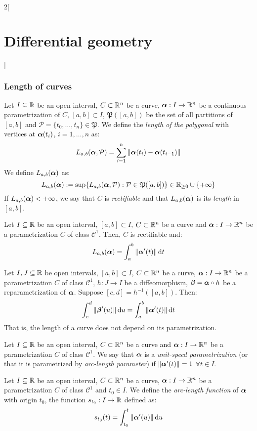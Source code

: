 \documentclass[../../../main_math.tex]{subfiles}
\begin{document}
\begin{multicols}{2}[\section{Differential geometry}]
  \subsubsection{Length of curves}
  \begin{definition}
    Let $I\subseteq\mathbb{R}$ be an open interval, $C\subset\mathbb{R}^n$ be a curve, $\boldsymbol{\mathrm{\alpha}}:I\rightarrow\mathbb{R}^n$ be a continuous parametrization of $C$, $[a,b]\subset I$, $\mathfrak{P}([a,b])$ be the set of all partitions of $[a,b]$ and $\mathcal{P}=\{t_0,\ldots,t_n\}\in\mathfrak{P}$. We define the \emph{length of the polygonal} with vertices at $\boldsymbol{\mathrm{\alpha}}(t_i)$, $i=1,\ldots,n$ as: $$L_{a,b}(\boldsymbol{\mathrm{\alpha}},\mathcal{P})=\sum_{i=1}^n\|\boldsymbol{\mathrm{\alpha}}(t_i)-\boldsymbol{\mathrm{\alpha}}(t_{i-1})\|$$ We define $L_{a,b}(\boldsymbol{\mathrm{\alpha}})$ as:
    $$L_{a,b}(\boldsymbol{\mathrm{\alpha}}):=\sup\{L_{a,b}(\boldsymbol{\mathrm{\alpha}},\mathcal{P}):\mathcal{P}\in\mathfrak{P}([a,b])\}\in\mathbb{R}_{\geq 0}\cup\{+\infty\}$$ If $L_{a,b}(\boldsymbol{\mathrm{\alpha}})<+\infty$, we say that $C$ is \emph{rectifiable} and that $L_{a,b}(\boldsymbol{\mathrm{\alpha}})$ is its \emph{length} in $[a,b]$.
  \end{definition}
  \begin{proposition}
    Let $I\subseteq\mathbb{R}$ be an open interval, $[a,b]\subset I$, $C\subset\mathbb{R}^n$ be a curve and $\boldsymbol{\mathrm{\alpha}}:I\rightarrow\mathbb{R}^n$ be a parametrization $C$ of class $\mathcal{C}^1$. Then, $C$ is rectifiable and: $$L_{a,b}(\boldsymbol{\mathrm{\alpha}})=\int_a^b\|\boldsymbol{\mathrm{\alpha}}'(t)\|\dd{t}$$
  \end{proposition}
  \begin{proposition}
    Let $I,J\subseteq\mathbb{R}$ be open intervals, $[a,b]\subset I$, $C\subset\mathbb{R}^n$ be a curve, $\boldsymbol{\mathrm{\alpha}}:I\rightarrow\mathbb{R}^n$ be a parametrization $C$ of class $\mathcal{C}^1$, $h:J\rightarrow I$ be a diffeomorphism, $\boldsymbol{\mathrm{\beta}}=\boldsymbol{\mathrm{\alpha}}\circ h$ be a reparametrization of $\boldsymbol{\mathrm{\alpha}}$. Suppose $[c,d]=h^{-1}([a,b])$. Then: $$\int_c^d\|\boldsymbol{\mathrm{\beta}}'(u)\|\dd{u}=\int_a^b\|\boldsymbol{\mathrm{\alpha}}'(t)\|\dd{t}$$ That is, the length of a curve does not depend on its parametrization.
  \end{proposition}
  \begin{definition}
    Let $I\subseteq\mathbb{R}$ be an open interval, $C\subset\mathbb{R}^n$ be a curve and $\boldsymbol{\mathrm{\alpha}}:I\rightarrow\mathbb{R}^n$ be a parametrization $C$ of class $\mathcal{C}^1$. We say that $\boldsymbol{\mathrm{\alpha}}$ is a \emph{unit-speed parametrization} (or that it is parametrized by \emph{arc-length parameter}) if $\|\boldsymbol{\mathrm{\alpha}}'(t)\|=1$ $\forall t\in I$.
  \end{definition}
  \begin{definition}
    Let $I\subseteq\mathbb{R}$ be an open interval, $C\subset\mathbb{R}^n$ be a curve, $\boldsymbol{\mathrm{\alpha}}:I\rightarrow\mathbb{R}^n$ be a parametrization $C$ of class $\mathcal{C}^1$ and $t_0\in I$. We define the \emph{arc-length function} of $\boldsymbol{\mathrm{\alpha}}$ with origin ${t_0}$, the function $s_{t_0}:I\rightarrow\mathbb{R}$ defined as: $$s_{t_0}(t)=\int_{t_0}^t\|\boldsymbol{\mathrm{\alpha}}'(u)\|\dd{u}$$

\end{definition}
\end{multicols}
\end{document}
